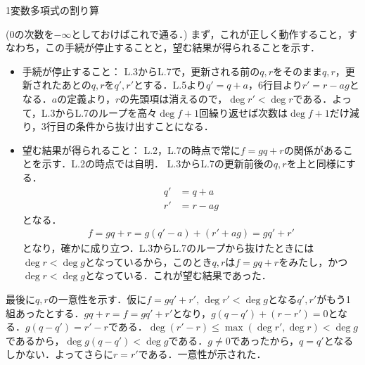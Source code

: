 \documentclass[9pt]{ltjsarticle}
\begin{document}
 \begin{myproof}
\begin{algorithm}[H]
\caption{1変数多項式の割り算}
 \begin{algorithmic}[1]
  \ENDWHILE
 \end{algorithmic}
\end{algorithm}
($0$の次数を$-\infty$としておけばこれで通る．)
まず，これが正しく動作すること，すなわち，この手続が停止することと，望む結果が得られることを示す．
\begin{itemize}
 \item 手続が停止すること：
L.3からL.7で，更新される前の$q,r$をそのまま$q,r$，更新されたあとの$q,r$を$q',r'$とする．L.5より$q'=q+a$，6行目より$r'=r-ag$となる．$a$の定義より，$r$の先頭項は消えるので，$\deg r' < \deg r$である．よって，L.3からL.7のループを高々$\deg f + 1$回繰り返せば次数は$\deg f + 1$だけ減り，3行目の条件から抜け出すことになる．
 \item 望む結果が得られること：
L.2，L.7の時点で常に$f=gq+r$の関係があることを示す．L.2の時点では自明．
L.3からL.7の更新前後の$q,r$を上と同様にする．
\begin{align}
 q' &= q+a\\
 r'& = r-ag
\end{align}
となる．
\begin{align}
 f = gq+r = g(q'-a) + (r'+ag) = gq' + r'
\end{align}
となり，確かに成り立つ．L.3からL.7のループから抜けたときには$\deg r < \deg g$となっているから，このとき$q,r$は$f=gq+r$をみたし，かつ$\deg r < \deg g$となっている．これが望む結果であった．
\end{itemize}
最後に$q,r$の一意性を示す．仮に$f=gq' + r',\, \deg r' < \deg g$となる$q',r'$がもう1組あったとする．$gq + r = f = gq' + r'$となり，$g(q-q') + (r-r') = 0$となる．$g(q-q') = r'-r$である．$\deg(r'-r) \le \max(\deg r', \deg r) < \deg g$であるから，$\deg g(q-q') < \deg g$である．$g\neq 0$であったから，$q = q'$となるしかない．よってさらに$r=r'$である．一意性が示された．
 \end{myproof}
\end{document}
